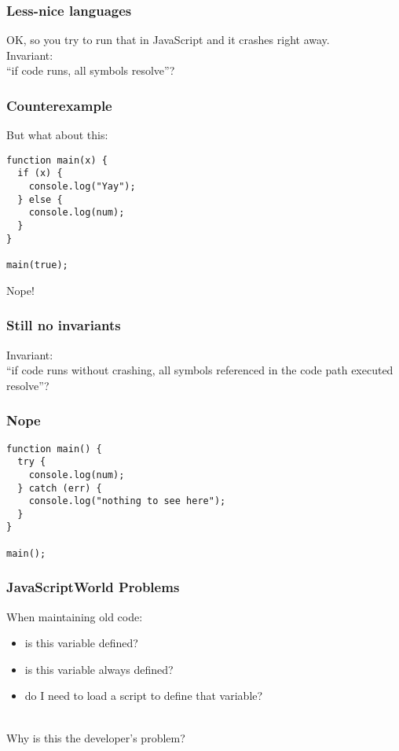 \documentclass{beamer}
\newenvironment{changemargin}[1]{%
  \begin{list}{}{%
    \setlength{\topsep}{0pt}%
    \setlength{\leftmargin}{#1}%
    \setlength{\rightmargin}{1em}
    \setlength{\listparindent}{\parindent}%
    \setlength{\itemindent}{\parindent}%
    \setlength{\parsep}{\parskip}%
  }%
  \item[]}{\end{list}}
\begin{document}
\begin{frame}[fragile]
\frametitle{Less-nice languages}
\begin{changemargin}{2cm}
OK, so you try to run that in JavaScript and it crashes right away.\\[1em]

Invariant:\\
\hspace*{2em} ``if code runs, all symbols resolve''?
\end{changemargin}
\end{frame}

\begin{frame}[fragile]
\frametitle{Counterexample}
\begin{changemargin}{2cm}
But what about this:
\begin{lstlisting}
function main(x) {
  if (x) {
    console.log("Yay");
  } else {
    console.log(num);
  }
}

main(true);
\end{lstlisting}
Nope!
\end{changemargin}
\end{frame}
\begin{frame}[fragile]
\frametitle{Still no invariants}
\begin{changemargin}{2cm}
Invariant:\\
\hspace*{2em} ``if code runs without crashing, all symbols referenced in the code path executed resolve''?
\end{changemargin}
\end{frame}

\begin{frame}[fragile]
\frametitle{Nope}
\begin{changemargin}{2cm}
\begin{lstlisting}
function main() {
  try {
    console.log(num);
  } catch (err) {
    console.log("nothing to see here");
  }
}

main();
\end{lstlisting}
\end{changemargin}
\end{frame}

\begin{frame}
\frametitle{JavaScriptWorld Problems}
\begin{changemargin}{2cm}
When maintaining old code:
\begin{itemize}
\item is this variable defined?
\item is this variable always defined?
\item do I need to load a script to define that variable?
\end{itemize}
~\\[1em]
Why is this the developer's problem?
\end{changemargin}
\end{frame}
\end{document}
